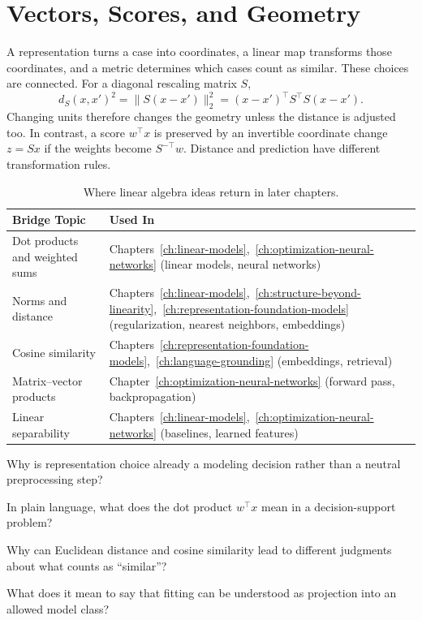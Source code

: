 \section{Vectors, Scores, and Geometry}

A representation turns a case into coordinates, a linear map transforms those coordinates, and a metric determines which cases count as similar. These choices are connected. For a diagonal rescaling matrix $S$,
\[
d_S(x,x')^2=\|S(x-x')\|_2^2
=(x-x')^\top S^\top S(x-x').
\]
Changing units therefore changes the geometry unless the distance is adjusted too. In contrast, a score $w^\top x$ is preserved by an invertible coordinate change $z=Sx$ if the weights become $S^{-\top}w$. Distance and prediction have different transformation rules.

\begin{table}[h]
\centering
\small
\caption{Where linear algebra ideas return in later chapters.}
\begin{tabular}{@{}L{2.75cm}L{7.05cm}@{}}
\toprule
\textbf{Bridge Topic} & \textbf{Used In} \\
\midrule
Dot products and weighted sums & Chapters~\ref{ch:linear-models},~\ref{ch:optimization-neural-networks} (linear models, neural networks) \\
Norms and distance & Chapters~\ref{ch:linear-models},~\ref{ch:structure-beyond-linearity},~\ref{ch:representation-foundation-models} (regularization, nearest neighbors, embeddings) \\
Cosine similarity & Chapters~\ref{ch:representation-foundation-models},~\ref{ch:language-grounding} (embeddings, retrieval) \\
Matrix--vector products & Chapter~\ref{ch:optimization-neural-networks} (forward pass, backpropagation) \\
Linear separability & Chapters~\ref{ch:linear-models},~\ref{ch:optimization-neural-networks} (baselines, learned features) \\
\bottomrule
\end{tabular}
\end{table}

\begin{studyquestions}
\item Why is representation choice already a modeling decision rather than a neutral preprocessing step?
\item In plain language, what does the dot product \(w^\top x\) mean in a decision-support problem?
\item Why can Euclidean distance and cosine similarity lead to different judgments about what counts as ``similar''?
\item What does it mean to say that fitting can be understood as projection into an allowed model class?
\end{studyquestions}

